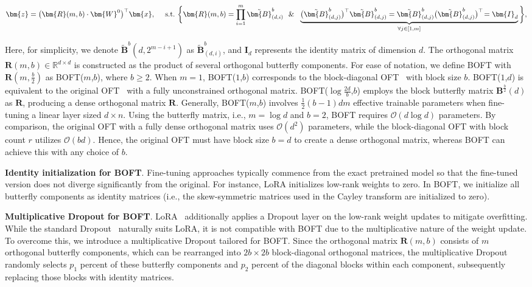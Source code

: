 \begin{equation}
    \begin{aligned}\nonumber
    \bm{z}=\big(\bm{R}(m,b)\cdot\bm{W}^0\big)^\top\bm{x},~~~~\text{s.t.}~\bigg{\{}\bm{R}(m,b)=\prod_{i=1}^m \tilde{\bm{B}}^b_{(d,i)}~~\&~~\underbrace{\big(\tilde{\bm{B}}^b_{(d,j)}\big)^\top\tilde{\bm{B}}^b_{(d,j)}=\tilde{\bm{B}}^b_{(d,j)}\big(\tilde{\bm{B}}^b_{(d,j)}\big)^\top\!=\bm{I}_d}_{\forall j\in [1, m]}\bigg{\}},
    \end{aligned}
\end{equation}

Here, for simplicity, we denote $\tilde{\bm{B}}^b(d,2^{m - i+1})$ as $\tilde{\bm{B}}^b_{(d,i)}$, and $\bm{I}_d$ represents the identity matrix of dimension $d$. The orthogonal matrix $\bm{R}(m,b)\in\mathbb{R}^{d\times d}$ is constructed as the product of several orthogonal butterfly components. For ease of notation, we define BOFT with $\bm{R}(m,\frac{b}{2})$ as BOFT($m$,$b$), where $b \geq 2$. When $m=1$, BOFT($1$,$b$) corresponds to the block-diagonal OFT~\cite{qiu2023controlling} with block size $b$. BOFT($1$,$d$) is equivalent to the original OFT~\cite{qiu2023controlling} with a fully unconstrained orthogonal matrix. BOFT($\log \frac{2d}{b}$,$b$) employs the block butterfly matrix $\bm{B}^{\frac{b}{2}}(d)$ as $\bm{R}$, producing a dense orthogonal matrix $\bm{R}$. Generally, BOFT($m$,$b$) involves $\frac{1}{2}(b-1)dm$ effective trainable parameters when fine-tuning a linear layer sized $d \times n$. Using the butterfly matrix, i.e., $m=\log d$ and $b=2$, BOFT requires $\mathcal{O}(d \log d)$ parameters. By comparison, the original OFT with a fully dense orthogonal matrix uses $\mathcal{O}(d^2)$ parameters, while the block-diagonal OFT with block count $r$ utilizes $\mathcal{O}(bd)$. Hence, the original OFT must have block size $b=d$ to create a dense orthogonal matrix, whereas BOFT can achieve this with any choice of $b$.

\textbf{Identity initialization for BOFT}. Fine-tuning approaches typically commence from the exact pretrained model so that the fine-tuned version does not diverge significantly from the original. For instance, LoRA initializes low-rank weights to zero. In BOFT, we initialize all butterfly components as identity matrices (i.e., the skew-symmetric matrices used in the Cayley transform are initialized to zero).

\textbf{Multiplicative Dropout for BOFT}. LoRA~\cite{hulora2022} additionally applies a Dropout layer on the low-rank weight updates to mitigate overfitting. While the standard Dropout~\cite{srivastava2014dropout} naturally suits LoRA, it is not compatible with BOFT due to the multiplicative nature of the weight update. To overcome this, we introduce a multiplicative Dropout tailored for BOFT. Since the orthogonal matrix $\bm{R}(m,b)$ consists of $m$ orthogonal butterfly components, which can be rearranged into $2b \times 2b$ block-diagonal orthogonal matrices, the multiplicative Dropout randomly selects $p_1$ percent of these butterfly components and $p_2$ percent of the diagonal blocks within each component, subsequently replacing those blocks with identity matrices.

